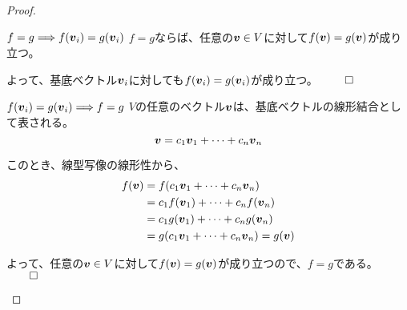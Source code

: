 \documentclass[../../../topic_linear-algebra]{subfiles}
\begin{document}
\begin{proof}
  \begin{subpattern}{$f = g \Longrightarrow f(\vb*{v}_i) = g(\vb*{v}_i)$}
    $f = g$ならば、任意の$\vb*{v} \in V$に対して$f(\vb*{v}) = g(\vb*{v})$が成り立つ。
    
    よって、基底ベクトル$\vb*{v}_i$に対しても$f(\vb*{v}_i) = g(\vb*{v}_i)$が成り立つ。 $\qed$
  \end{subpattern}
  
  \begin{subpattern}{$f(\vb*{v}_i) = g(\vb*{v}_i) \Longrightarrow f = g$}
    $V$の任意のベクトル$\vb*{v}$は、基底ベクトルの線形結合として表される。
    \begin{equation*}
      \vb*{v} = c_1 \vb*{v}_1 + \cdots + c_n \vb*{v}_n
    \end{equation*}
    
    このとき、線型写像の線形性から、
    \begin{align*}
      f(\vb*{v}) &= f(c_1 \vb*{v}_1 + \cdots + c_n \vb*{v}_n) \\
      &= c_1 f(\vb*{v}_1) + \cdots + c_n f(\vb*{v}_n) \\
      &= c_1 g(\vb*{v}_1) + \cdots + c_n g(\vb*{v}_n) \\
      &= g(c_1 \vb*{v}_1 + \cdots + c_n \vb*{v}_n) = g(\vb*{v})
    \end{align*}
    
    よって、任意の$\vb*{v} \in V$に対して$f(\vb*{v}) = g(\vb*{v})$が成り立つので、$f = g$である。 $\qed$
  \end{subpattern}
\end{proof}
\end{document}
